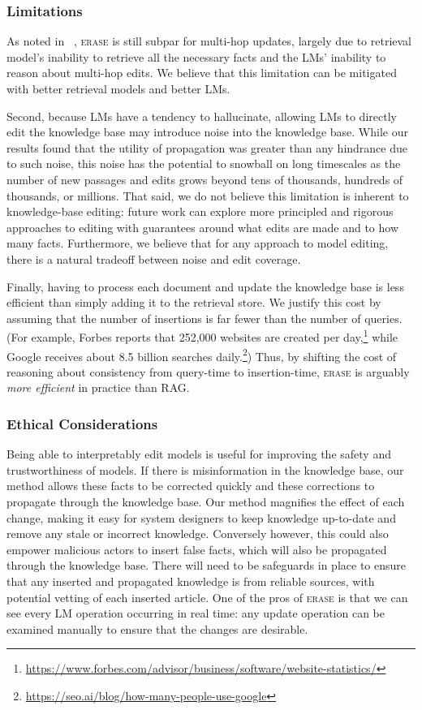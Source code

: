 \documentclass[11pt]{article}
\newcommand{\ourmethod}{\textsc{erase}\xspace}
\begin{document}
\subsubsection*{Limitations}
As noted in ~, \ourmethod is still subpar for multi-hop updates, largely due to retrieval model's inability to retrieve all the necessary facts and the LMs' inability to reason about multi-hop edits. We believe that this limitation can be mitigated with better retrieval models and better LMs.

Second, because LMs have a tendency to hallucinate, allowing LMs to directly edit the knowledge base may introduce noise into the knowledge base. While our results found that the utility of propagation was greater than any hindrance due to such noise, this noise has the potential to snowball on long timescales as the number of new passages and edits grows beyond tens of thousands, hundreds of thousands, or millions.
That said, we do not believe this limitation is inherent to knowledge-base editing: future work can explore more principled and rigorous approaches to editing with guarantees around what edits are made and to how many facts.
Furthermore, we believe that for any approach to model editing, there is a natural tradeoff between noise and edit coverage. 

Finally, having to process each document and update the knowledge base is less efficient than simply adding it to the retrieval store. We justify this cost by assuming that the number of insertions is far fewer than the number of queries. (For example, Forbes reports that 252,000 websites are created per day,\footnote{\url{https://www.forbes.com/advisor/business/software/website-statistics/}} while Google receives about 8.5 billion searches daily.\footnote{\url{https://seo.ai/blog/how-many-people-use-google}}) Thus, by shifting the cost of reasoning about consistency from query-time to insertion-time, \ourmethod is arguably \textit{more efficient} in practice than RAG.


\subsubsection*{Ethical Considerations}
Being able to interpretably edit models is useful for improving the safety and trustworthiness of models. If there is misinformation in the knowledge base, our method allows these facts to be corrected quickly and these corrections to propagate through the knowledge base.
Our method magnifies the effect of each change, making it easy for system designers to keep knowledge up-to-date and remove any stale or incorrect knowledge.
Conversely however, this could also empower malicious actors to insert false facts, which will also be propagated through the knowledge base.
There will need to be safeguards in place to ensure that any inserted and propagated knowledge is from reliable sources, with potential vetting of each inserted article. One of the pros of \ourmethod is that we can see every LM operation occurring in real time: any update operation can be examined manually to ensure that the changes are desirable.





\newpage

\appendix

\end{document}

